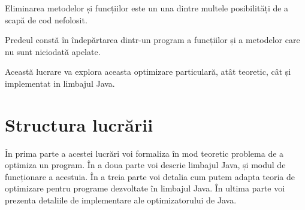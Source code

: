 Eliminarea metodelor și funcțiilor este un una dintre multele
posibilități de a scapă de cod nefolosit.

Predeul constă în îndepărtarea dintr-un program a funcțiilor și a
metodelor care nu sunt niciodată apelate.

Această lucrare va explora aceasta optimizare particulară, atât
teoretic, cât și implementat in limbajul Java.

\section{Structura lucrării}

În prima parte a acestei lucrări voi formaliza în mod teoretic
problema de a optimiza un program.
În a doua parte voi descrie limbajul Java, și modul de
funcționare a acestuia.
În a treia parte voi detalia cum putem adapta teoria de
optimizare pentru programe dezvoltate în limbajul Java.
În ultima parte voi prezenta detaliile de implementare ale
optimizatorului de Java.
